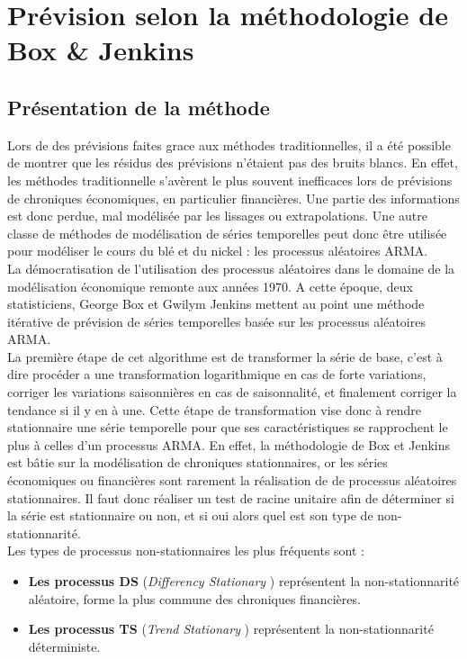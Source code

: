 \section{Prévision selon la méthodologie de Box \& Jenkins}
\subsection{Présentation de la méthode}
Lors de des prévisions faites grace aux méthodes traditionnelles, il a été possible de montrer que les résidus des prévisions n'étaient pas des bruits blancs. En effet, 
les méthodes traditionnelle s'avèrent le plus souvent inefficaces lors de prévisions de chroniques économiques, en particulier financières. Une partie des informations est 
donc perdue, mal modélisée par les lissages ou extrapolations. Une autre classe de méthodes de modélisation de séries temporelles peut donc être utilisée pour modéliser le 
cours du blé et du nickel : les processus aléatoires ARMA.\\[11pt]
La démocratisation de l'utilisation des processus aléatoires dans le domaine de la modélisation économique remonte aux années 1970. A cette époque, deux statisticiens, 
George Box et Gwilym Jenkins mettent au point une méthode itérative de prévision de séries temporelles basée sur les processus aléatoires ARMA. \\[11pt]
La première étape de cet algorithme est de transformer la série de base, c'est à dire procéder a une transformation logarithmique en cas de forte variations, corriger les 
variations saisonnières en cas de saisonnalité, et finalement corriger la tendance si il y en à une. Cette étape de transformation vise donc à rendre stationnaire une 
série temporelle pour que ses caractéristiques se rapprochent le plus à celles d'un processus ARMA. En effet, la méthodologie de Box et Jenkins est bâtie sur la 
modélisation de chroniques stationnaires, or les séries économiques ou financières sont rarement la réalisation de de processus aléatoires stationnaires. Il faut donc 
réaliser un test de racine unitaire afin de déterminer si la série est stationnaire ou non, et si oui alors quel est son type de non-stationnarité.\\[11pt]
Les types de processus non-stationnaires les plus fréquents sont :
\begin{itemize}
    \item \textbf{Les processus DS}  (\textit{Differency Stationary} ) représentent la non-stationnarité aléatoire, forme la plus commune des chroniques financières.
    \item \textbf{Les processus TS}  (\textit{Trend Stationary} ) représentent la non-stationnarité déterministe.
\end{itemize}
